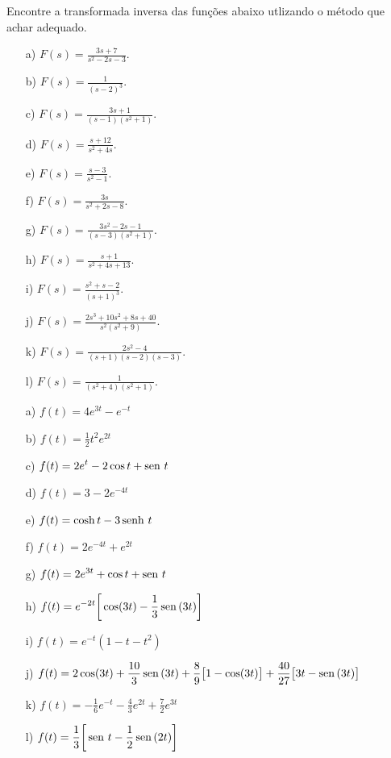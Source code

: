 \begin{exer}
Encontre a transformada inversa das funções abaixo utlizando o método que achar adequado.
\begin{itemize}
\item[a)] $\displaystyle F(s)= \frac{3s + 7}{s^2 - 2 s - 3}$.
\item[b)] $\displaystyle F(s)= \frac{1}{(s-2)^3}$.
\item[c)] $\displaystyle F(s)= \frac{3s + 1}{(s-1)(s^2 +1)}$.
\item[d)] $\displaystyle F(s)= \frac{s + 12}{s^2 +4s}$.
\item[e)] $\displaystyle F(s)= \frac{s -3}{s^2 -1}$.
\item[f)] $\displaystyle F(s)= \frac{3s}{s^2 +2s -8}$.
\item[g)] $\displaystyle F(s)= \frac{3s^2 -2s - 1}{(s-3)(s^2 +1)}$.
\item[h)] $\displaystyle F(s)= \frac{s + 1}{s^2 +4s +13}$.
\item[i)] $\displaystyle F(s)= \frac{s^2 + s -2}{(s +1)^3}$.
\item[j)] $\displaystyle F(s)= \frac{2s^3 +10s^2+8s+40}{s^2(s^2 +9)}$.
\item[k)] $\displaystyle F(s)= \frac{2s^2 -4}{(s+1)(s-2)(s-3)}$.
\item[l)] $\displaystyle F(s)= \frac{1}{(s^2+4)(s^2 +1)}$.
\end{itemize}
\end{exer}
\begin{resp}
\begin{itemize}
  \item[a)] $\displaystyle f(t) = 4e^{3t} - e^{-t}$
  \item[b)] $\displaystyle f(t) = \frac{1}{2} t^2 e^{2t}$
  \item[c)] $\displaystyle f(t) = 2e^{t} - 2 \cos t + \operatorname{sen}\, t$
  \item[d)] $\displaystyle f(t) = 3 -2 e^{-4t}$
  \item[e)] $\displaystyle f(t) = \cosh t - 3 \operatorname{senh}\, t$
  \item[f)] $\displaystyle f(t) = 2e^{-4t} + e^{2t}$
  \item[g)] $\displaystyle f(t) = 2e^{3t} + \cos t + \operatorname{sen}\, t$
  \item[h)] $\displaystyle f(t) = e^{-2t}\bigg[ \cos(3t) - \frac{1}{3} \operatorname{sen}\, (3t) \bigg]$
  \item[i)] $\displaystyle f(t) = e^{-t}(1-t-t^2)$
  \item[j)] $\displaystyle f(t) = 2\cos(3t) +\frac{10}{3} \operatorname{sen}\,(3t) +\frac{8}{9} \big[1-\cos(3t)\big] + \frac{40}{27} \big[3t - \operatorname{sen}\,(3t)\big]$
  \item[k)] $\displaystyle f(t) = -\frac{1}{6} e^{-t} -\frac{4}{3} e^{2t} + \frac{7}{2} e^{3t}$
  \item[l)] $\displaystyle f(t) = \frac{1}{3} \bigg[ \operatorname{sen}\, t - \frac{1}{2}\operatorname{sen}\,(2t) \bigg]$
\end{itemize}
\end{resp}






